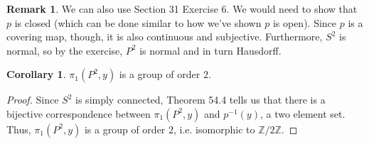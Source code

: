 \documentclass[11pt]{article}
\newcommand{\Z}{\mathbb{Z}}
\theoremstyle{definition}
\theoremstyle{theorem}
\newtheorem*{corollary}{Corollary}
\newtheorem*{remark}{Remark}
\begin{document}
\begin{remark}
We can also use Section 31 Exercise 6. We would need to show that $p$ is closed (which can be done similar to how we've shown $p$ is open). Since $p$ is a covering map, though, it is also continuous and subjective. Furthermore, $S^2$ is normal, so by the exercise, $P^2$ is normal and in turn Hausdorff.
\end{remark}

\begin{corollary}
$\pi_1(P^2, y)$ is a group of order $2$.
\end{corollary}

\begin{proof}
Since $S^2$ is simply connected, Theorem 54.4 tells us that there is a bijective correspondence between $\pi_1(P^2, y)$ and $p^{-1}(y)$, a two element set. Thus, $\pi_1(P^2, y)$ is a group of order $2$, i.e. isomorphic to $\Z / 2\Z.$
\end{proof}
\end{document}
